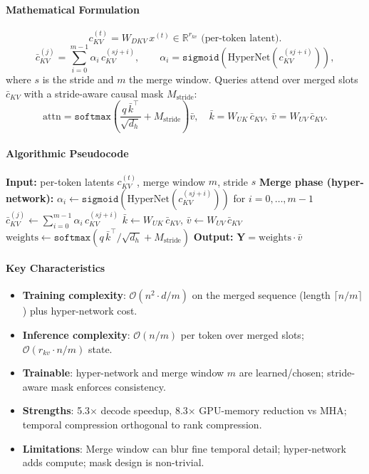 \paragraph{Mathematical Formulation}
\[
c_{KV}^{(t)} = W_{DKV}\, x^{(t)} \in \mathbb{R}^{r_{kv}} \text{ (per-token latent)}.
\]
\[
\bar c_{KV}^{(j)} = \sum_{i=0}^{m-1} \alpha_i\, c_{KV}^{(s j + i)}, \qquad \alpha_i = \texttt{sigmoid}(\text{HyperNet}(c_{KV}^{(s j + i)})),
\]
where $s$ is the stride and $m$ the merge window. Queries attend over merged slots $\bar c_{KV}$ with a stride-aware causal mask $M_{\text{stride}}$:
\[
\text{attn} = \texttt{softmax}\!\left(\frac{q\, \bar k^\top}{\sqrt{d_h}} + M_{\text{stride}}\right) \bar v, \quad \bar k = W_{UK}\, \bar c_{KV},\ \bar v = W_{UV}\, \bar c_{KV}.
\]

\paragraph{Algorithmic Pseudocode}
\begin{algorithmic}[1]
\State \textbf{Input:} per-token latents $c_{KV}^{(t)}$, merge window $m$, stride $s$
\State \textbf{Merge phase (hyper-network):}
    \State $\alpha_i \gets \texttt{sigmoid}(\text{HyperNet}(c_{KV}^{(s j + i)}))$ for $i = 0, \ldots, m-1$
    \State $\bar c_{KV}^{(j)} \gets \sum_{i=0}^{m-1} \alpha_i\, c_{KV}^{(s j + i)}$ 
\EndFor
\State $\bar k \gets W_{UK}\, \bar c_{KV}$, \quad $\bar v \gets W_{UV}\, \bar c_{KV}$
\State $\text{weights} \gets \texttt{softmax}(q\, \bar k^\top / \sqrt{d_h} + M_{\text{stride}})$ 
\State \textbf{Output:} $\mathbf{Y} = \text{weights} \cdot \bar v$
\end{algorithmic}

\paragraph{Key Characteristics}
\begin{itemize}[leftmargin=*]
    \item \textbf{Training complexity}: $\mathcal{O}(n^2 \cdot d / m)$ on the merged sequence (length $\lceil n/m \rceil$) plus hyper-network cost.
    \item \textbf{Inference complexity}: $\mathcal{O}(n/m)$ per token over merged slots; $\mathcal{O}(r_{kv} \cdot n / m)$ state.
    \item \textbf{Trainable}: hyper-network and merge window $m$ are learned/chosen; stride-aware mask enforces consistency.
    \item \textbf{Strengths}: 5.3$\times$ decode speedup, 8.3$\times$ GPU-memory reduction vs MHA; temporal compression orthogonal to rank compression.
    \item \textbf{Limitations}: Merge window can blur fine temporal detail; hyper-network adds compute; mask design is non-trivial.
\end{itemize}

